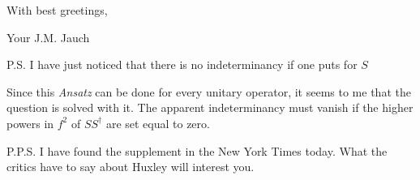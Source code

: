 With best greetings,

Your J.M. Jauch

P.S. I have just noticed that there is no indeterminancy if one puts for $S$

Since this \textit{Ansatz} can be done for every unitary operator, it seems to me that the question is solved with it. The apparent indeterminancy must vanish if the higher powers in $f^2$ of $SS^\dagger$ are set equal to zero.

P.P.S. I have found the supplement in the New York Times today. What the critics have to say about Huxley will interest you.

